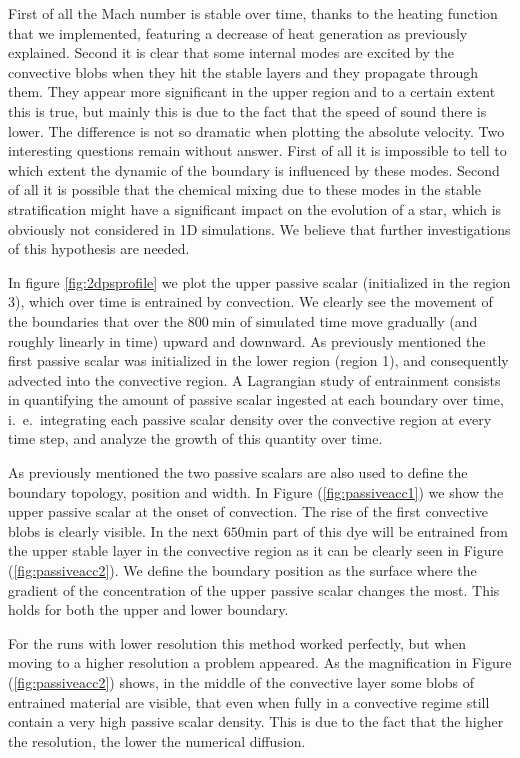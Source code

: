 First of all the Mach number is stable over time, thanks to the heating function that we implemented, featuring a decrease of heat generation as previously explained. 
Second it is clear that some internal modes are excited by the convective blobs when they hit the stable layers and they propagate through them. They appear more significant in the upper region and to a certain extent this is true, but mainly this is due to the fact that the speed of sound there is lower. The difference is not so dramatic when plotting the absolute velocity. Two interesting questions remain without answer. First of all it is impossible to tell to which extent the dynamic of the boundary is influenced by these modes. Second of all it is possible that the chemical mixing due to these modes in the stable stratification might have a significant impact on the evolution of a star, which is obviously not considered in 1D simulations. We believe that further investigations of this hypothesis are needed.

In figure \ref{fig:2dpsprofile} we plot the upper passive scalar (initialized in the region 3), which over time is entrained by convection. We clearly see the movement of the boundaries that over the $800 \ \mathrm{min}$ of simulated time move gradually (and roughly linearly in time) upward and downward. As previously mentioned the first passive scalar was initialized in the lower region (region 1), and consequently advected into the convective region. A Lagrangian study of entrainment consists in quantifying the amount of passive scalar ingested at each boundary over time, i.\ e.\ integrating each passive scalar density over the convective region at every time step, and analyze the growth of this quantity over time.

As previously mentioned the two passive scalars are also used to define the boundary topology, position and width. In Figure (\ref{fig:passiveacc1}) we show the upper passive scalar at the onset of convection. The rise of the first convective blobs is clearly visible. In the next $650 \mathrm{min}$ part of this dye will be entrained from the upper stable layer in the convective region as it can be clearly seen in Figure (\ref{fig:passiveacc2}). We define the boundary position as the surface where the gradient of the concentration of the upper passive scalar changes the most. This holds for both the upper and lower boundary.
  
  For the runs with lower resolution this method worked perfectly, but when moving to a higher resolution a problem appeared. As the magnification in Figure (\ref{fig:passiveacc2}) shows, in the middle of the convective layer some blobs of entrained material are visible, that even when fully in a convective regime still contain a very high passive scalar density. This is due to the fact that the higher the resolution, the lower the numerical diffusion.
  
